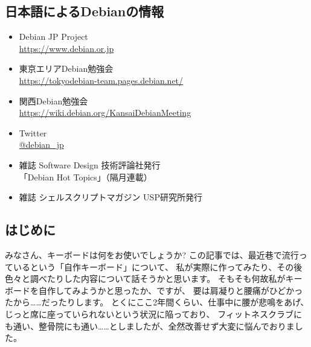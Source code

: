 \documentclass[mingoth,a4paper]{jsarticle}
\begin{document}

\subsection{日本語によるDebianの情報}

\begin{itemize}
  \item Debian JP Project \\
      \url{https://www.debian.or.jp}
  \item 東京エリアDebian勉強会\\
      \url{https://tokyodebian-team.pages.debian.net/}
  \item 関西Debian勉強会 \\
      \url{https://wiki.debian.org/KansaiDebianMeeting}
  \item Twitter \\
      \url{@debian_jp}
  \item 雑誌 Software Design 技術評論社発行 \\
    「Debian Hot Topics」（隔月連載）
  \item 雑誌 シェルスクリプトマガジン USP研究所発行
\end{itemize}

%
%
%
%




\subsection{はじめに}

みなさん、キーボードは何をお使いでしょうか?
この記事では、最近巷で流行っているという「自作キーボード」について、
私が実際に作ってみたり、その後色々と調べたりした内容について話そうかと思います。
そもそも何故私がキーボードを自作してみようかと思ったか、ですが、
要は肩凝りと腰痛がひどかったから……だったりします。
とくにここ2年間くらい、仕事中に腰が悲鳴をあげ、
じっと席に座っていられないという状況に陥っており、
フィットネスクラブにも通い、整骨院にも通い……としましたが、全然改善せず大変に悩んでおりました。
\end{document}
